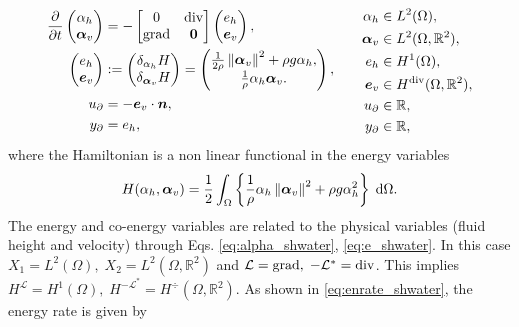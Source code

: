 \begin{equation}
\begin{aligned}
\diffp{}{t}
\begin{pmatrix}
\alpha_h \\
\bm{\alpha}_v \\
\end{pmatrix} &= -
\begin{bmatrix}
0 & \div \\
\grad & \bm{0}
\end{bmatrix}
\begin{pmatrix}
e_h \\
\bm{e}_v \\
\end{pmatrix}, \\
\begin{pmatrix}
e_h  \\
\bm{e}_v
\end{pmatrix}
&:=
\begin{pmatrix}
\delta_{\alpha_h} H\\
\delta_{\bm{\alpha}_v} H
\end{pmatrix} = 
\begin{pmatrix}
\frac{1}{2 \rho} \norm{\bm{\alpha}_v}^2 + \rho g \alpha_h, \\
\frac{1}{\rho} \alpha_h \bm{\alpha}_v.
\end{pmatrix}, \\
{u}_\partial &= - \bm{e}_v \cdot\bm{n}, \\
{y}_\partial &= {e}_h, \\
\end{aligned} \qquad 
\begin{aligned}
\alpha_h &\in L^2(\Omega), \\
\bm{\alpha}_v &\in L^2(\Omega, \mathbb{R}^2), \\
e_h &\in H^1(\Omega), \\
\bm{e}_v &\in H^{\div}(\Omega, \mathbb{R}^2), \\
u_\partial &\in \mathbb{R}, \\
y_\partial &\in \mathbb{R},
\end{aligned}
\end{equation} 
where the Hamiltonian is a non linear functional in the energy variables 
\begin{equation*}
H(\alpha_h, \bm{\alpha}_v) = \energy{\frac{1}{\rho} \alpha_h \norm{\bm{\alpha}_v}^2 + \rho g \alpha_h^2}.
\end{equation*}
The energy and co-energy variables are related to the physical variables (fluid height and velocity) through Eqs. \eqref{eq:alpha_shwater}, \eqref{eq:e_shwater}. In this case $X_1 = L^2(\Omega),\; X_2 = L^2(\Omega, \mathbb{R}^2)$ and $\mathcal{L} = \operatorname*{grad}, \; -\mathcal{L}^* = \operatorname{div}$. This implies $H^{\mathcal{L}} = H^1(\Omega), \; H^{-\mathcal{L}^*} = H^{\div}(\Omega, \mathbb{R}^2)$. As shown in \eqref{eq:enrate_shwater}, the energy rate is given by 
